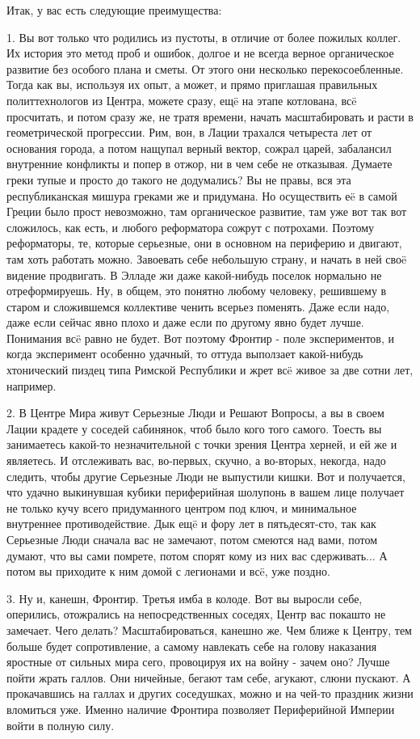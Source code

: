 Итак, у вас есть следующие преимущества:


1. Вы вот только что родились из пустоты, в отличие от более пожилых коллег. Их история это метод проб и ошибок, долгое и не всегда верное органическое развитие без особого плана и сметы. От этого они несколько перекосоебленные. Тогда как вы, используя их опыт, а может, и прямо приглашая правильных политтехнологов из Центра, можете сразу, ещë на этапе котлована, всë просчитать, и потом сразу же, не тратя времени, начать масштабировать и расти в геометрической прогрессии. Рим, вон, в Лации трахался четыреста лет от основания города, а потом нащупал верный вектор, сожрал царей, забалансил внутренние конфликты и попер в отжор, ни в чем себе не отказывая. Думаете греки тупые и просто до такого не додумались? Вы не правы, вся эта республиканская мишура греками же и придумана. Но осуществить еë в самой Греции было прост невозможно, там органическое развитие, там уже вот так вот сложилось, как есть, и любого реформатора сожрут с потрохами. Поэтому реформаторы, те, которые серьезные, они в основном на периферию и двигают, там хоть работать можно. Завоевать себе небольшую страну, и начать в ней своë видение продвигать. В Элладе жи даже какой-нибудь поселок нормально не отреформируешь. Ну, в общем, это понятно любому человеку, решившему в старом и сложившемся коллективе ченить всерьез поменять. Даже если надо, даже если сейчас явно плохо и даже если по другому явно будет лучше. Понимания всë равно не будет. Вот поэтому Фронтир - поле экспериментов, и когда эксперимент особенно удачный, то оттуда выползает какой-нибудь хтонический пиздец типа Римской Республики и жрет всë живое за две сотни лет, например.


2. В Центре Мира живут Серьезные Люди и Решают Вопросы, а вы в своем Лации крадете у соседей сабинянок, чтоб было кого того самого. Тоесть вы занимаетесь какой-то незначительной с точки зрения Центра херней, и ей же и являетесь. И отслеживать вас, во-первых, скучно, а во-вторых, некогда, надо следить, чтобы другие Серьезные Люди не выпустили кишки. Вот и получается, что удачно выкинувшая кубики периферийная шолупонь в вашем лице получает не только кучу всего придуманного центром под ключ, и минимальное внутреннее противодействие. Дык ещë и фору лет в пятьдесят-сто, так как Серьезные Люди сначала вас не замечают, потом смеются над вами, потом думают, что вы сами помрете, потом спорят кому из них вас сдерживать... А потом вы приходите к ним домой с легионами и всë, уже поздно.


3. Ну и, канешн, Фронтир. Третья имба в колоде. Вот вы выросли себе, оперились, отожрались на непосредственных соседях, Центр вас покашто не замечает. Чего делать? Масштабироваться, канешно же. Чем ближе к Центру, тем больше будет сопротивление, а самому навлекать себе на голову наказания яростные от сильных мира сего, провоцируя их на войну - зачем оно? Лучше пойти жрать галлов. Они ничейные, бегают там себе, агукают, слюни пускают. А прокачавшись на галлах и других соседушках, можно и на чей-то праздник жизни вломиться уже. Именно наличие Фронтира позволяет Периферийной Империи войти в полную силу.


